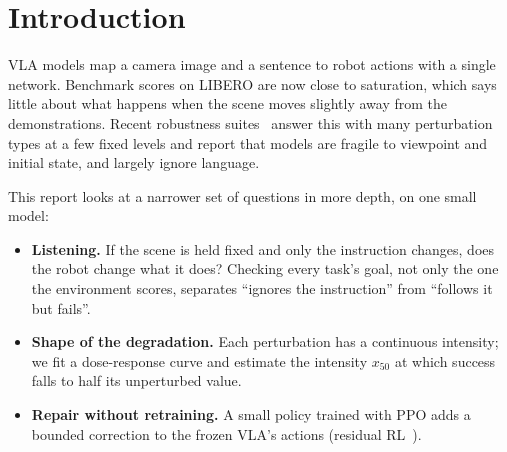 \begin{abstract}
Vision-language-action (VLA) models are evaluated almost exclusively in the conditions they were
trained on. We probe SmolVLA~\citep{shukor2025smolvla}, a 450M-parameter open VLA, on the LIBERO
benchmark~\citep{liu2023libero} with three questions. \emph{Does it listen?} In LIBERO-Goal, where ten
tasks share one scene, we swap instructions and check all ten goal predicates at every step: the robot
reaches the goal of the instruction it is given in \LangOffInstructed{} of swapped episodes and the
environment's own goal in \LangOffEnv{}, but hand-written paraphrases of the same instruction succeed
far less often (\LangParaPct{} against \LangOrigPct{}). \emph{How does it break?} Under five graded
perturbations, success declines gradually with camera viewpoint, collapses past sharp thresholds for
lighting and pixel noise, and is halved by an offset of about 3$^\circ$ per arm joint at the start of the
episode. \emph{Can a small corrector help?} A residual policy trained with PPO on top of the frozen VLA
improves success on the initial states it was trained on but not on held-out ones, and mostly learns to
finish successful episodes faster. All results come from \TotalEpisodes{} simulated episodes run on a
laptop, with per-episode logs and code released.
\end{abstract}

\section{Introduction}
VLA models map a camera image and a sentence to robot actions with a single network. Benchmark scores
on LIBERO are now close to saturation, which says little about what happens when the scene moves
slightly away from the demonstrations. Recent robustness suites~\citep{fei2025liberoplus,zhou2025liberopro}
answer this with many perturbation types at a few fixed levels and report that models are fragile to
viewpoint and initial state, and largely ignore language.

This report looks at a narrower set of questions in more depth, on one small model:
\begin{itemize}
  \item \textbf{Listening.} If the scene is held fixed and only the instruction changes, does the robot
  change what it does? Checking every task's goal, not only the one the environment scores, separates
  ``ignores the instruction'' from ``follows it but fails''.
  \item \textbf{Shape of the degradation.} Each perturbation has a continuous intensity; we fit a dose-response
  curve and estimate the intensity $x_{50}$ at which success falls to half its unperturbed value.
  \item \textbf{Repair without retraining.} A small policy trained with PPO adds a bounded correction to
  the frozen VLA's actions (residual RL~\citep{silver2018residual,johannink2019residual}).
\end{itemize}

